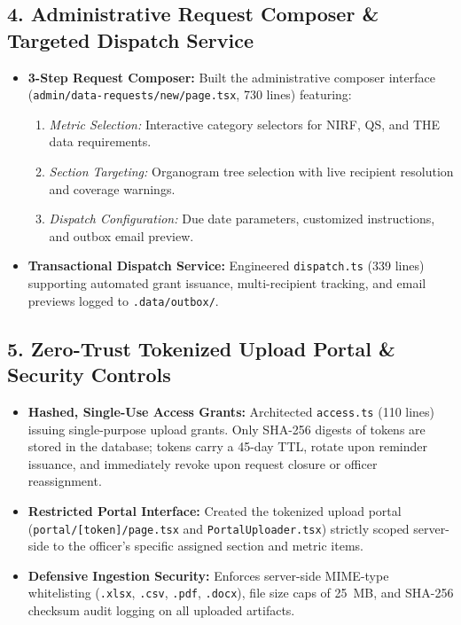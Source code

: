 \documentclass[11pt,a4paper]{article}
\begin{document}
\subsection{4. Administrative Request Composer \& Targeted Dispatch Service}
\begin{itemize}[leftmargin=1.4em, itemsep=2pt]
\item \textbf{3-Step Request Composer:} Built the administrative composer interface (\texttt{admin/data-requests/new/page.tsx}, 730 lines) featuring:
  \begin{enumerate}[leftmargin=1.2em, itemsep=1pt]
  \item \textit{Metric Selection:} Interactive category selectors for NIRF, QS, and THE data requirements.
  \item \textit{Section Targeting:} Organogram tree selection with live recipient resolution and coverage warnings.
  \item \textit{Dispatch Configuration:} Due date parameters, customized instructions, and outbox email preview.
  \end{enumerate}
\item \textbf{Transactional Dispatch Service:} Engineered \texttt{dispatch.ts} (339 lines) supporting automated grant issuance, multi-recipient tracking, and email previews logged to \texttt{.data/outbox/}.
\end{itemize}

\subsection{5. Zero-Trust Tokenized Upload Portal \& Security Controls}
\begin{itemize}[leftmargin=1.4em, itemsep=2pt]
\item \textbf{Hashed, Single-Use Access Grants:} Architected \texttt{access.ts} (110 lines) issuing single-purpose upload grants. Only SHA-256 digests of tokens are stored in the database; tokens carry a 45-day TTL, rotate upon reminder issuance, and immediately revoke upon request closure or officer reassignment.
\item \textbf{Restricted Portal Interface:} Created the tokenized upload portal (\texttt{portal/[token]/page.tsx} and \texttt{PortalUploader.tsx}) strictly scoped server-side to the officer's specific assigned section and metric items.
\item \textbf{Defensive Ingestion Security:} Enforces server-side MIME-type whitelisting (\texttt{.xlsx}, \texttt{.csv}, \texttt{.pdf}, \texttt{.docx}), file size caps of 25~MB, and SHA-256 checksum audit logging on all uploaded artifacts.
\end{itemize}
\end{document}
